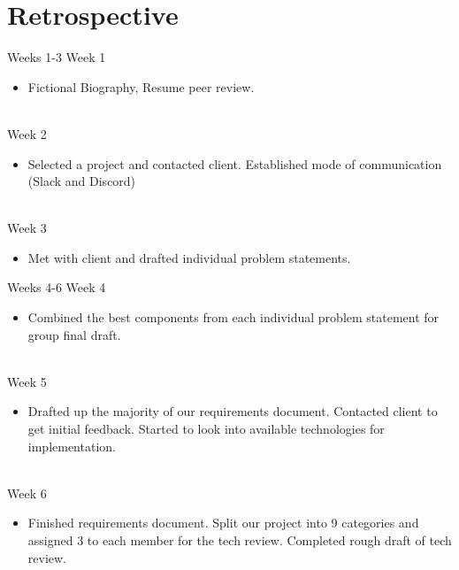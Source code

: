 \documentclass{beamer}
\begin{document}
\section{Retrospective}

\begin{frame}{Weeks 1-3}
    Week 1
    \begin{itemize} %
        \item Fictional Biography, Resume peer review. 
    \end{itemize}
    \hrulefill\\
    Week 2
    \begin{itemize} %
        \item Selected a project and contacted client. Established mode of communication (Slack and Discord)
    \end{itemize}
    \hrulefill\\
    Week 3
    \begin{itemize} %
        \item Met with client and drafted individual problem statements.
    \end{itemize}
\end{frame}


\begin{frame}{Weeks 4-6}
    Week 4
    \begin{itemize} %
        \item Combined the best components from each individual problem statement for group final draft. 
    \end{itemize}
    \hrulefill\\
    Week 5
    \begin{itemize} %
        \item Drafted up the majority of our requirements document. Contacted client to get initial feedback.  Started to look into available technologies for implementation.
    \end{itemize}
    \hrulefill\\
    Week 6
    \begin{itemize} %
        \item Finished requirements document. Split our project into 9 categories and assigned 3 to each member for the tech review. Completed rough draft of tech review. 
    \end{itemize}
\end{frame}
\end{document}
